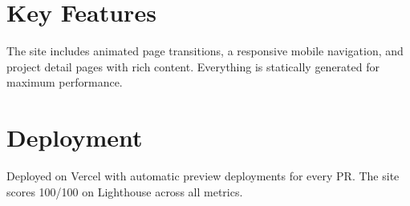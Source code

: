\section{Key Features}

The site includes animated page transitions, a responsive mobile navigation, and project detail pages with rich content. Everything is statically generated for maximum performance.

\section{Deployment}

Deployed on Vercel with automatic preview deployments for every PR. The site scores 100/100 on Lighthouse across all metrics.



